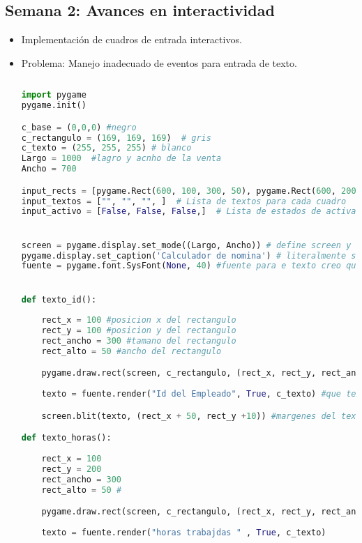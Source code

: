 \documentclass[a4paper,12pt]{article}
\begin{document}
\subsection*{Semana 2: Avances en interactividad}
\begin{itemize}
    \item Implementación de cuadros de entrada interactivos.
    \item Problema: Manejo inadecuado de eventos para entrada de texto.

    \begin{lstlisting}[language=python]
        
import pygame
pygame.init()

c_base = (0,0,0) #negro
c_rectangulo = (169, 169, 169)  # gris
c_texto = (255, 255, 255) # blanco
Largo = 1000  #lagro y acnho de la venta
Ancho = 700

input_rects = [pygame.Rect(600, 100, 300, 50), pygame.Rect(600, 200, 300, 50), pygame.Rect(600, 300, 300, 50)]
input_textos = ["", "", "", ]  # Lista de textos para cada cuadro
input_activo = [False, False, False,]  # Lista de estados de activación para cada cuadro


screen = pygame.display.set_mode((Largo, Ancho)) # define screen y ademas define el largo y anho de la ventana
pygame.display.set_caption('Calculador de nomina') # literalmente solo nombra la ventaa xd\
fuente = pygame.font.SysFont(None, 40) #fuente para e texto creo que es arial segun reddit no lo es pero no onfio en esos locos]


def texto_id():
    
    rect_x = 100 #posicion x del rectangulo
    rect_y = 100 #posicion y del rectangulo
    rect_ancho = 300 #tamano del rectangulo
    rect_alto = 50 #ancho del rectangulo

    pygame.draw.rect(screen, c_rectangulo, (rect_x, rect_y, rect_ancho, rect_alto)) #literalmente solo dibuje
    
    texto = fuente.render("Id del Empleado", True, c_texto) #que texto quiero que salga en el recatangulo

    screen.blit(texto, (rect_x + 50, rect_y +10)) #margenes del texto

def texto_horas():
    
    rect_x = 100 
    rect_y = 200 
    rect_ancho = 300 
    rect_alto = 50 #

    pygame.draw.rect(screen, c_rectangulo, (rect_x, rect_y, rect_ancho, rect_alto)) 
    
    texto = fuente.render("horas trabajdas " , True, c_texto) 


\end{lstlisting}
\end{itemize}
\end{document}
